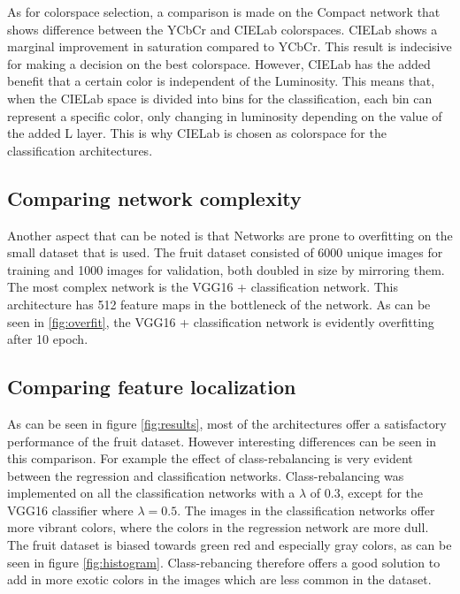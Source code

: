 As for colorspace selection, a comparison is made on the Compact network that shows difference between the YCbCr and CIELab colorspaces. CIELab shows a marginal improvement in saturation compared to YCbCr. This result is indecisive for making a decision on the best colorspace. However, CIELab has the added benefit that a certain color is independent of the Luminosity. This means that, when the CIELab space is divided into bins for the classification, each bin can represent a specific color, only changing in luminosity depending on the value of the added L layer. This is why CIELab is chosen as colorspace for the classification architectures.


\subsection{Comparing network complexity}
Another aspect that can be noted is that Networks are prone to overfitting on the small dataset that is used. The fruit dataset consisted of 6000 unique images for training and 1000 images for validation, both doubled in size by mirroring them. The most complex network is the VGG16 + classification network. This architecture has 512 feature maps in the bottleneck of the network. As can be seen in \ref{fig:overfit}, the VGG16 + classification network is evidently overfitting after 10 epoch. 


\subsection{Comparing feature localization}
As can be seen in figure \ref{fig:results}, most of the architectures offer a satisfactory performance of the fruit dataset. However interesting differences can be seen in this comparison. For example the effect of class-rebalancing is very evident between the regression and classification networks. Class-rebalancing was implemented on all the classification networks with a $\lambda$ of 0.3, except for the VGG16 classifier where $\lambda = 0.5$. The images in the classification networks offer more vibrant colors, where the colors in the regression network are more dull. The fruit dataset is biased towards green red and especially gray colors, as can be seen in figure \ref{fig:histogram}. Class-rebancing therefore offers a good solution to add in more exotic colors in the images which are less common in the dataset.

